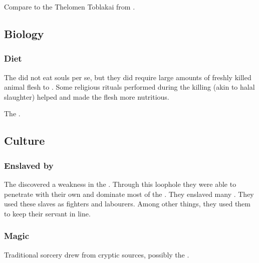 Compare to the Thelomen Toblakai from \cite{StevenEriksonIanCameronEsslemont:MalazanBookoftheFallen}. 









\subsection{Biology}





\subsubsection{Diet}
The \aryothim did not eat souls per se, but they did require large amounts of freshly killed animal flesh to . 
Some religious rituals performed during the killing (akin to halal slaughter) helped and made the flesh more nutritious.

The \aryothim {}. 









\subsection{Culture}





\subsubsection{Enslaved by \resphain}
The \resphain discovered a weakness in the \aryoth \nexus. 
Through this loophole they were able to penetrate with their own \nexus and dominate most of the \aryoth \nexus.
They enslaved many \aryothim.
They used these slaves as fighters and labourers. 
Among other things, they used them to keep their servant \humans in line.






\subsubsection{Magic}
Traditional \aryoth sorcery drew from cryptic sources, possibly the . 





